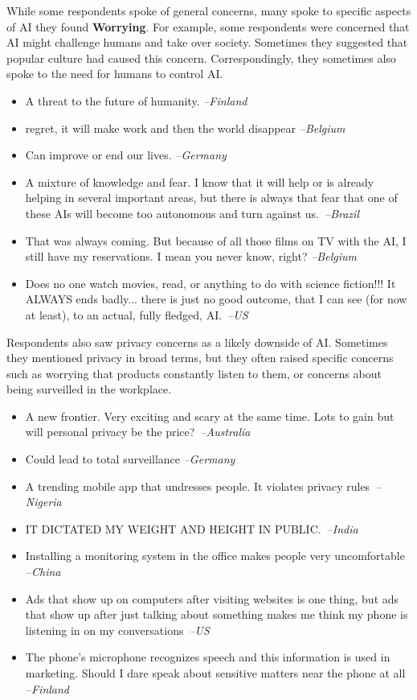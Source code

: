 \documentclass[11pt]{article} %
\newcommand\aff[1]{\textcolor{darkplum}{{\emph{--#1}}}}
\newenvironment{lq2}
{ \vspace{-3pt}
  \begin{itemize}[leftmargin = 4.0em, rightmargin=5.0em, label={}]
    \fontsize{10pt}{10.7pt}\selectfont
    \setlength{\itemsep}{3pt}
    \setlength{\parskip}{2.5pt}
    \setlength{\parsep}{3pt}     }
{ \end{itemize} \vspace{1pt}  }
\def\Worrying/{{\fontfamily{lmss}\selectfont\textbf{Worrying}}}
\begin{document}
While some respondents spoke of general concerns, many spoke to specific aspects of AI they found \Worrying/. For example, some respondents were concerned that AI might challenge humans and take over society. Sometimes they suggested that popular culture had caused this concern. Correspondingly, they sometimes also spoke to the need for humans to control AI.
\begin{lq2}
\item A threat to the future of humanity. \aff{Finland}
\item regret, it will make work and then the world disappear \aff{Belgium}
\item Can improve or end our lives. \aff{Germany}
\item A mixture of knowledge and fear. I know that it will help or is already helping in several important areas, but there is always that fear that one of these AIs will become too autonomous and turn against us.~\aff{Brazil}
\item That was always coming. But because of all those films on TV with the AI, I still have my reservations. I mean you never know, right? \aff{Belgium}
\item Does no one watch movies, read, or anything to do with science fiction!!! It ALWAYS ends badly... there is just no good outcome, that I can see (for now at least), to an actual, fully fledged, AI.~\aff{US} 
\end{lq2}

Respondents also saw privacy concerns as a likely downside of AI. Sometimes they mentioned privacy in broad terms, but they often raised specific concerns such as worrying that products constantly listen to them, or concerns about being surveilled in the workplace.
\begin{lq2}
\item A new frontier. Very exciting and scary at the same time. Lots to gain but will personal privacy be the price?~\aff{Australia}
\item Could lead to total surveillance \aff{Germany}
\item A trending mobile app that undresses people. It violates privacy rules~\aff{Nigeria}
\item IT DICTATED MY WEIGHT AND HEIGHT IN PUBLIC.~\aff{India}
\item Installing a monitoring system in the office makes people very uncomfortable \aff{China}
\item Ads that show up on computers after visiting websites is one thing, but ads that show up after just talking about something makes me think my phone is listening in on my conversations~\aff{US}
\item The phone's microphone recognizes speech and this information is used in marketing. Should I dare speak about sensitive matters near the phone at all \aff{Finland}
\end{lq2}
\end{document}
